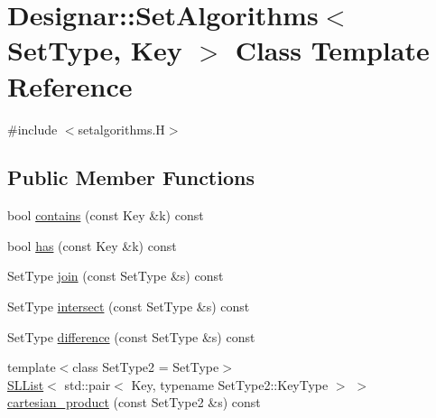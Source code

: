 \hypertarget{class_designar_1_1_set_algorithms}{}\section{Designar\+:\+:Set\+Algorithms$<$ Set\+Type, Key $>$ Class Template Reference}
\label{class_designar_1_1_set_algorithms}


{\ttfamily \#include $<$setalgorithms.\+H$>$}

\subsection*{Public Member Functions}
\begin{DoxyCompactItemize}
\item 
bool \hyperlink{class_designar_1_1_set_algorithms_a490a87d0cb7793ce6ef065affa89bd42}{contains} (const Key \&k) const
\item 
bool \hyperlink{class_designar_1_1_set_algorithms_a9427240bf90b69bd89135903570a8439}{has} (const Key \&k) const
\item 
Set\+Type \hyperlink{class_designar_1_1_set_algorithms_aebbac6e18649aa234b273960575ecec9}{join} (const Set\+Type \&s) const
\item 
Set\+Type \hyperlink{class_designar_1_1_set_algorithms_ae5eccd220351a0b473135c3a3dda01e2}{intersect} (const Set\+Type \&s) const
\item 
Set\+Type \hyperlink{class_designar_1_1_set_algorithms_a0f266c5f84c89f6a79ca21ec97eb7661}{difference} (const Set\+Type \&s) const
\item 
{\footnotesize template$<$class Set\+Type2  = Set\+Type$>$ }\\\hyperlink{class_designar_1_1_s_l_list}{S\+L\+List}$<$ std\+::pair$<$ Key, typename Set\+Type2\+::\+Key\+Type $>$ $>$ \hyperlink{class_designar_1_1_set_algorithms_a10ba40d1455ea532b1c1b56cc4092d75}{cartesian\+\_\+product} (const Set\+Type2 \&s) const
\end{DoxyCompactItemize}
